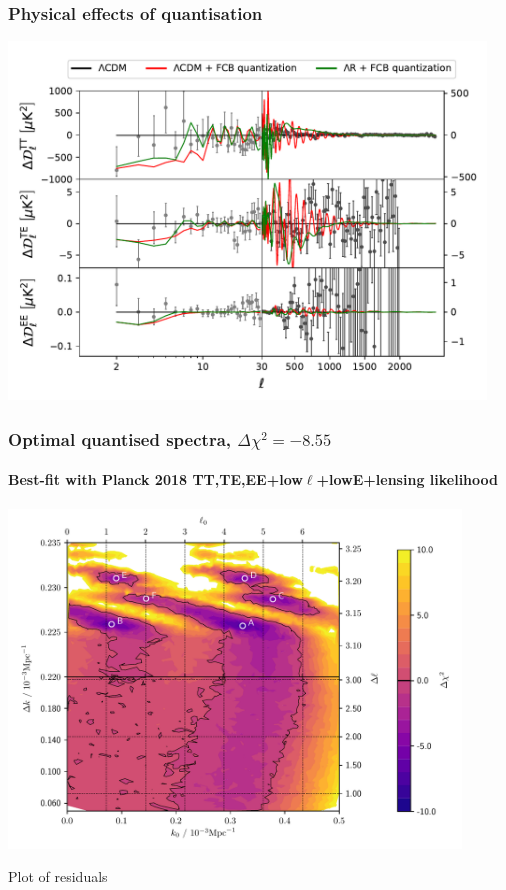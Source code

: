 \documentclass[%
]{beamer}
\begin{document}
\begin{frame}
    \frametitle{Physical effects of quantisation}
    \centerline{%
        \includegraphics[width=0.95\textwidth]{all_delta_dl_fcb}
    }
\end{frame}

\begin{frame}
    \frametitle{Optimal quantised spectra, $\Delta\chi^2=-8.55$}
    \framesubtitle{Best-fit with Planck 2018 TT,TE,EE+low$\ell$+lowE+lensing likelihood}
    \centerline{%
        \includegraphics[width=0.9\textwidth]{contour_plot_twoscales}
    }

    Plot of residuals
\end{frame}
\end{document}
